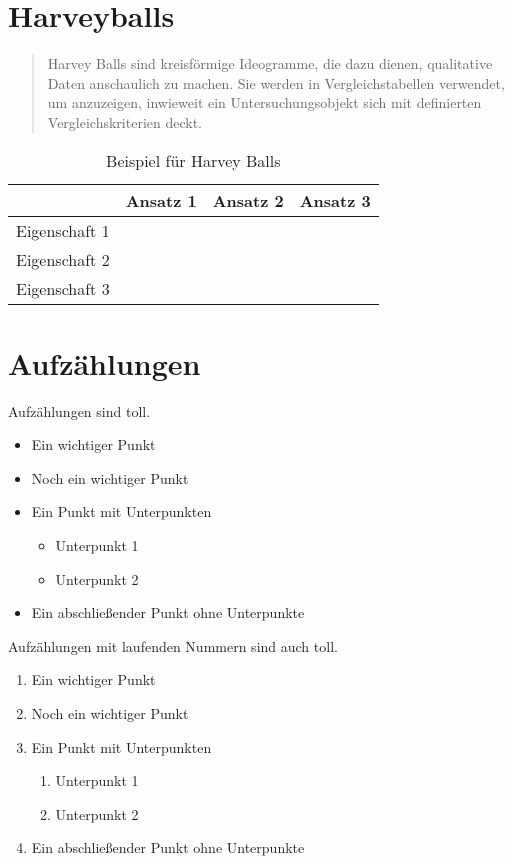 \section{Harveyballs}

\begin{quote}
    Harvey Balls sind kreisförmige Ideogramme, die dazu dienen, qualitative Daten anschaulich zu machen. Sie werden in Vergleichstabellen verwendet, um anzuzeigen, inwieweit ein Untersuchungsobjekt sich mit definierten Vergleichskriterien deckt. \parencite{Wikipedia_HarveyBalls}
\end{quote}

\begin{table}[h]
  \caption{Beispiel für Harvey Balls}
  \label{tab:harveyexample}
  \centering
  \begin{tabular}{lccc}
    \toprule
    & Ansatz 1 & Ansatz 2 & Ansatz 3\\
    \midrule
    Eigenschaft 1	& \harveyBallNone & \harveyBallQuarter & \harveyBallHalf \\
    Eigenschaft 2	& \harveyBallHalf & \harveyBallThreeQuarter & \harveyBallFull \\
    Eigenschaft 3	& \harveyBallFull & \harveyBallThreeQuarter & \harveyBallQuarter\\
    \bottomrule
  \end{tabular}
\end{table}


\section{Aufzählungen}

Aufzählungen sind toll.

\begin{itemize}
  \item Ein wichtiger Punkt
  \item Noch ein wichtiger Punkt
  \item Ein Punkt mit Unterpunkten
    \begin{itemize}
      \item Unterpunkt 1
      \item Unterpunkt 2
    \end{itemize}
  \item Ein abschließender Punkt ohne Unterpunkte
\end{itemize}


Aufzählungen mit laufenden Nummern sind auch toll.

\begin{enumerate}
  \item Ein wichtiger Punkt
  \item Noch ein wichtiger Punkt
  \item Ein Punkt mit Unterpunkten
    \begin{enumerate}
      \item Unterpunkt 1
      \item Unterpunkt 2
    \end{enumerate}
  \item Ein abschließender Punkt ohne Unterpunkte
\end{enumerate}
